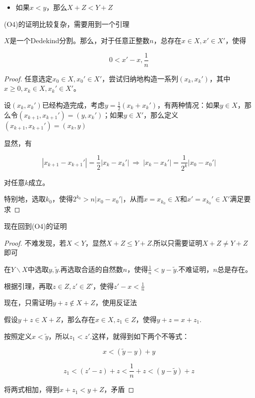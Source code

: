 \begin{itemize}
    \item[(O4)] 如果$x<y$，那么$X+Z<Y+Z$ 
\end{itemize}

(O4)的证明比较复杂，需要用到一个引理

\begin{lemma}
    $X$是一个Dedekind分割。那么，对于任意正整数$n$，总存在$x\in X,x'\in X'$，使得

    \begin{equation*}
        0<x'-x,\frac{1}{n}
    \end{equation*}
\end{lemma}

\begin{proof}
    任意选定$x_0\in X,x_0'\in X'$，尝试归纳地构造一系列$(x_k,x_k')$，其中$x\geq 0,x_k \in X,x_k'\in X'$。

    设$(x_k,x_k')$已经构造完成，考虑$y=\displaystyle \frac{1}{2}(x_k+x_k')$，有两种情况：如果$y\in X$，那么令$(x_{k+1},x_{k+1}')=(y,x_k')$；如果$y\in X'$，那么定义$(x_{k+1},x_{k+1}')=(x_k,y)$

    显然，有

    \begin{equation*}
        |x_{k+1}-x_{k+1}'|=\frac{1}{2}|x_k-x_k'|\ \Rightarrow \ |x_k-x_k'| = \frac{1}{2^k}|x_0-x_0'|
    \end{equation*}

    对任意$k$成立。

    特别地，选取$k_0$，使得$2^{k_0}>n|x_0-x_0'|$，从而$x=x_{k_0}\in X$和$x'=x_{k_0}'\in X'$满足要求

    \qde
\end{proof}

现在回到(O4)的证明

\begin{proof}
    不难发现，若$X<Y$，显然$X+Z\leq Y+Z$.所以只需要证明$X+Z\neq Y+Z$即可

    在$Y\backslash X$中选取$y,\tilde{y}$.再选取合适的自然数$n$，使得$\displaystyle \frac{1}{n}<y-\tilde{y}$.不难证明，$n$总是存在。

    根据引理，再取$z\in Z,z'\in Z'$，使得$\displaystyle z'-x<\frac{1}{n}$

    现在，只需证明$y+z\notin X+Z$，使用反证法

    假设$y+z \in X+Z$，那么存在$x\in X,z_1\in Z$，使得$y+z=x+z_1$.

    按照定义$x<\tilde{y}$，所以$z_1<z'$.这样，就得到如下两个不等式：

    \begin{equation*}
        x<(\tilde{y}-y)+y
    \end{equation*}

    \begin{equation*}
        z_1<(z'-z)+z<\frac{1}{n}+z<(y-\tilde{y})+z
    \end{equation*}

    将两式相加，得到$x+z_1<y+Z$，矛盾
\end{proof}

